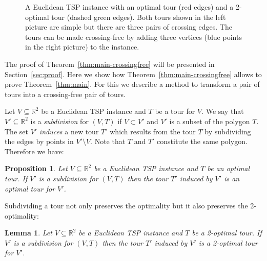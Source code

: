 \documentclass[a4paper, 11pt]{article}
\newtheorem{proposition}[theorem]{Proposition}
\newtheorem{lemma}[theorem]{Lemma}
\begin{document}
\begin{figure}[t]
\caption{A Euclidean TSP instance with an optimal tour (red edges) and a 2-optimal tour (dashed green edges). Both tours shown in the left picture 
are simple but there are three pairs of crossing edges. The tours can be made crossing-free by adding three vertices (blue points in the right picture) to the instance.}
\label{fig:crossingEdges}
\end{figure}


The proof of Theorem~\ref{thm:main-crossingfree} will be presented in Section~\ref{sec:proof}. Here we show how Theorem~\ref{thm:main-crossingfree}
allows to prove Theorem~\ref{thm:main}. For this we describe a method to transform a pair of tours into a crossing-free pair of tours.  


Let $V\subseteq \mathbb{R}^2$ be a Euclidean TSP instance and $T$ be a tour for $V$. We say that $V'\subseteq \mathbb{R}^2$ 
is a \emph{subdivision} for $(V,T)$ if $V \subset V'$ and $V'$ is a subset of the polygon $T$.  The set $V'$ \emph{induces} a new tour $T'$ which results from 
the tour $T$ by subdividing the edges by points in $V'\setminus V$. Note that $T$ and $T'$ constitute the same polygon.
Therefore we have:


\begin{proposition}
Let $V\subseteq \mathbb{R}^2$ be a Euclidean TSP instance and $T$ be an optimal tour. 
If $V'$ is a subdivision  for $(V,T)$ then the tour $T'$ induced by $V'$ is an optimal tour for $V'$.
\label{prop:optimality-preserved}
\end{proposition}
  

Subdividing a tour not only preserves the optimality but it also preserves the 2-optimality:


\begin{lemma}
Let $V\subseteq \mathbb{R}^2$ be a Euclidean TSP instance and $T$ be a 2-optimal tour. 
If $V'$ is a subdivision  for $(V,T)$ then the tour $T'$ induced by $V'$ is a 2-optimal tour for $V'$.
\label{lemma:2-optimality-preserved}
\end{lemma}
  
\end{document}
